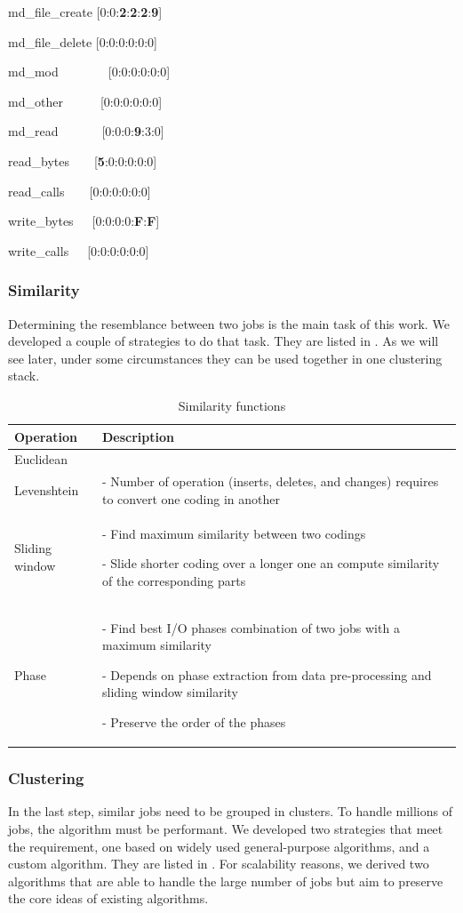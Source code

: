 \documentclass[]{llncs}
\begin{document}
md\_file\_create [0:0:\textbf{2}:\textbf{2}:\textbf{2}:\textbf{9}]

md\_file\_delete [0:0:0:0:0:0]

md\_mod\ \ \ \ \ \ \ \  [0:0:0:0:0:0]

md\_other\ \ \ \ \ \  [0:0:0:0:0:0]

md\_read\ \ \ \ \ \ \  [0:0:0:\textbf{9}:3:0]

read\_bytes\ \ \ \  [\textbf{5}:0:0:0:0:0]

read\_calls\ \ \ \  [0:0:0:0:0:0]

write\_bytes\ \ \  [0:0:0:0:\textbf{F}:\textbf{F}]

write\_calls\ \ \  [0:0:0:0:0:0]

\subsubsection{Similarity}
Determining the resemblance between two jobs is the main task of this work.
We developed a couple of strategies to do that task.
They are listed in .
As we will see later, under some circumstances they can be used together in one clustering stack.

\begin{table}
  \centering
  \begin{tabular}{ll}
    \hline
    Operation & Description \\
    \hline
    Euclidean & \\
    \hline
    Levenshtein &  - Number of operation (inserts, deletes, and changes) requires to convert one coding in another \\
    \hline
    Sliding window &  - Find maximum similarity between two codings \par - Slide shorter coding over a longer one an compute similarity of the corresponding parts \\
    \hline
    Phase &  - Find best I/O phases combination of two jobs with a maximum similarity \par - Depends on phase extraction from data pre-processing and sliding window similarity \par - Preserve the order of the phases \\
    \hline
  \end{tabular}
  \caption{Similarity functions}
  \label{tab:sim_funcs}
\end{table}

\subsubsection{Clustering}
In the last step, similar jobs need to be grouped in clusters.
To handle millions of jobs, the algorithm must be performant.
We developed two strategies that meet the requirement, one based on widely used general-purpose algorithms, and a custom algorithm.
They are listed in .
For scalability reasons, we derived two algorithms that are able to handle the large number of jobs but aim to preserve the core ideas of existing algorithms.
\end{document}
